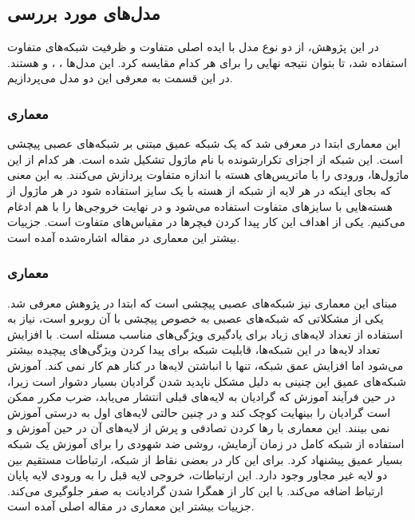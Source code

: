 \subsection{مدل‌های مورد بررسی}\label{subsec:مدل‌های مورد بررسی}
در این پژوهش، از دو نوع مدل با ایده اصلی متفاوت و ظرفیت شبکه‌های متفاوت استفاده شد، تا بتوان نتیجه نهایی را برای هر کدام مقایسه کرد.
این مدل‌ها \cite{szegedy2016rethinking}، \cite{szegedy2017inception}، \cite{he2016deep} و \cite{he2016deep} هستند. 
در این قسمت به معرفی این دو مدل می‌پردازیم.

\subsubsection{معماری }
این معماری ابتدا در \cite{szegedy2015going} معرفی شد که یک شبکه عمیق مبتنی بر شبکه‌های عصبی پیچشی است. این شبکه از اجزای تکرارشونده با نام ماژول  تشکیل شده است. هر کدام از این ماژول‌ها، ورودی را با ماتریس‌های هسته با اندازه متفاوت پردازش می‌کنند. به این معنی که بجای اینکه در هر لایه از شبکه  از هسته با یک سایز استفاده شود در هر ماژول از هسته‌هایی با سایزهای متفاوت استفاده می‌شود و در نهایت خروجی‌ها را با هم ادغام می‌کنیم. یکی از اهداف این کار پیدا کردن فیچرها در مقیاس‌های متفاوت است. جزییات بیشتر این معماری در مقاله اشاره‌شده آمده است.


\subsubsection{معماری }
مبنای این معماری نیز شبکه‌های عصبی پیچشی است که ابتدا در پژوهش \cite{he2016deep} معرفی شد.
یکی از مشکلاتی که شبکه‌های عصبی به خصوص پیچشی با آن روبرو است، نیاز به استفاده از تعداد لایه‌های زیاد برای یادگیری ویژگی‌های مناسب مسئله است.
با افزایش تعداد لایه‌ها در این شبکه‌ها، قابلیت شبکه برای پیدا کردن ویژگی‌های پیچیده بیشتر می‌شود اما افزایش عمق شبکه، تنها با انباشتن لایه‌ها در کنار هم کار نمی کند.
آموزش شبکه‌های عمیق این چنینی به دلیل مشکل ناپدید شدن گرادیان بسیار دشوار است زیرا، در حین فرآیند آموزش که گرادیان به لایه‌های قبلی انتشار می‌یابد، ضرب مکرر ممکن است گرادیان را بینهایت کوچک کند و در چنین حالتی لایه‌های اول به درستی آموزش نمی بینند.
این معماری با رها کردن تصادفی و پرش از لایه‌های آن در حین آموزش و استفاده از شبکه کامل در زمان آزمایش، روشی ضد شهودی را برای آموزش یک شبکه بسیار عمیق پیشنهاد کرد. برای این کار در بعضی نقاط از شبکه، ارتباطات مستقیم بین دو لایه غیر مجاور وجود دارد. این ارتباطات، خروجی لایه قبل را به ورودی لایه پایان ارتباط اضافه می‌کند. با این کار از همگرا شدن گرادیانت به صفر جلوگیری می‌کند. جزییات بیشتر این معماری در مقاله اصلی آمده است.